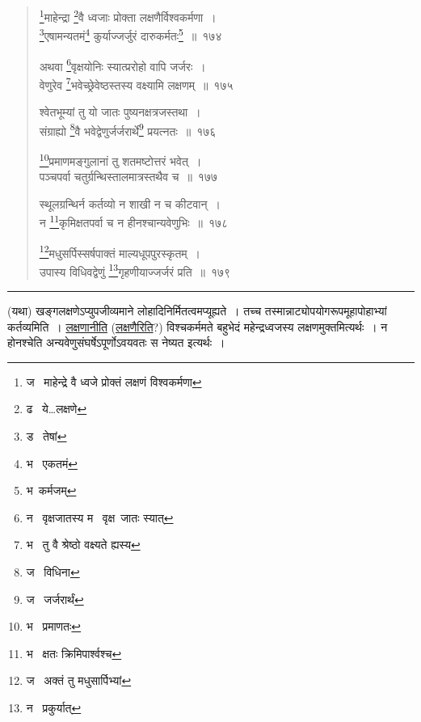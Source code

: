 \documentclass[11pt, openany]{book}
\begin{document}
\newpage

\begin{quote}
{\na \renewcommand{\thefootnote}{1}\footnote{ज \textendash\ माहेन्द्रे वै ध्वजे प्रोक्तं लक्षणं विश्वकर्मणा}माहेन्द्रा \renewcommand{\thefootnote}{2}\footnote{ढ \textendash\ ये\ldots लक्षणे}वै ध्वजाः प्रोक्ता लक्षणैर्विश्वकर्मणा~।\\
\renewcommand{\thefootnote}{3}\footnote{ड \textendash\ तेषां}एषामन्यतमं\renewcommand{\thefootnote}{4}\footnote{भ \textendash\ एकतमं} कुर्याज्जर्जुरं दारुकर्मतः\renewcommand{\thefootnote}{5}\footnote{भ\textendash\ कर्मजम्}~॥~१७४

अथवा \renewcommand{\thefootnote}{6}\footnote{न \textendash\ वृक्षजातस्य म \textendash\ वृक्ष\textendash\ जातः स्यात्}वृक्षयोनिः स्यात्प्ररोहो वापि जर्जरः~।\\
वेणुरेव \renewcommand{\thefootnote}{7}\footnote{भ \textendash\ तु वै श्रेष्ठो वक्ष्यते ह्यस्य}भवेच्छ्रेवेष्ठस्तस्य वक्ष्यामि लक्षणम्~॥~१७५

श्वेतभूम्यां तु यो जातः पुष्यनक्षत्रजस्तथा~।\\
संग्राह्यो \renewcommand{\thefootnote}{8}\footnote{ज \textendash\ विधिना}वै भवेद्वेणुर्जर्जरार्थे\renewcommand{\thefootnote}{9}\footnote{ज \textendash\ जर्जरार्थं} प्रयत्नतः~॥~१७६

\renewcommand{\thefootnote}{10}\footnote{भ \textendash\ प्रमाणतः}प्रमाणमङ्गुलानां तु शतमष्टोत्तरं भवेत्~।\\
पञ्चपर्वा चतुर्ग्रन्थिस्तालमात्रस्तथैव च~॥~१७७

स्थूलग्रन्थिर्न कर्तव्यो न शाखी न च कीटवान्~।\\
न \renewcommand{\thefootnote}{11}\footnote{भ \textendash\ क्षतः क्रिमिपार्श्वश्च}कृमिक्षतपर्वा च न हीनश्चान्यवेणुभिः~॥~१७८

\renewcommand{\thefootnote}{12}\footnote{ज \textendash\ अक्तं तु मधुसार्पिभ्यां}मधुसर्पिस्सर्षपाक्तं माल्यधूपपुरस्कृतम्~।\\
उपास्य विधिवद्वेणुं \renewcommand{\thefootnote}{13}\footnote{न \textendash\ प्रकुर्यात्}गृहणीयाज्जर्जरं प्रति~॥~१७९}
\end{quote}

\hrule

\vspace{2mm}
(यथा) खङ्गलक्षणेऽप्युपजीव्यमाने लोहादिनिर्मितत्वमप्यूह्यते~। तच्च तस्मान्नाट्योपयोगरूपमूहापोहाभ्यां कर्तव्यमिति~। \underline{लक्षणानीति} (\underline{लक्षणैरिति}?) विश्चकर्ममते बहुभेदं महेन्द्रध्वजस्य लक्षणमुक्तमित्यर्थः~। न होनश्चेति अन्यवेणुसंघर्षेऽपूर्णोऽवयवतः स नेष्यत इत्यर्थः~।
\end{document}
